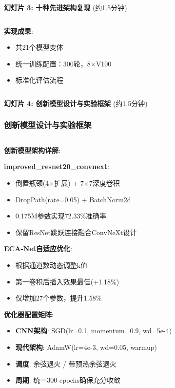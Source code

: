 \documentclass[10pt]{beamer}
\begin{document}
\begin{frame}{\textbf{幻灯片 3: 十种先进架构复现} (约1.5分钟)}
{\begin{columns}[T]
\begin{column}{0.5\textwidth}
        \vspace{0.1em}
        \textbf{实现成果}:
        \begin{itemize}
            \item 共21个模型变体
            \item 统一训练配置：300轮，8×V100
            \item 标准化评估流程
        \end{itemize}
    \end{column}
\end{columns}
}

\end{frame}

\begin{frame}{\textbf{幻灯片 4: 创新模型设计与实验框架} (约1.5分钟)}
\frametitle{创新模型设计与实验框架}

{\scriptsize
\begin{columns}[T]
    \begin{column}{0.48\textwidth}
        \textbf{创新模型架构详解}:
        
            \textbf{improved\_resnet20\_convnext}:
            \begin{itemize}
                \item 倒置瓶颈(4×扩展) + 7×7深度卷积
                \item DropPath(rate=0.05) + BatchNorm2d
                \item 0.175M参数实现72.33\%准确率
                \item 保留ResNet跳跃连接融合ConvNeXt设计
            \end{itemize}
            \textbf{ECA-Net自适应优化}:
            \begin{itemize}
                \item 根据通道数动态调整k值
                \item 第一卷积后插入效果最佳(+1.18\%)
                \item 仅增加27个参数，提升1.58\%
            \end{itemize}
        \textbf{优化器配置矩阵}:
        \begin{itemize}
            \item \textbf{CNN架构}: SGD(lr=0.1, momentum=0.9, wd=5e-4)
            \item \textbf{现代架构}: AdamW(lr=4e-3, wd=0.05, warmup)
            \item \textbf{调度}: 余弦退火 / 带预热余弦退火
            \item \textbf{周期}: 统一300 epochs确保充分收敛
        \end{itemize}
        

\end{column}
\end{columns}}
\end{frame}
\end{document}
